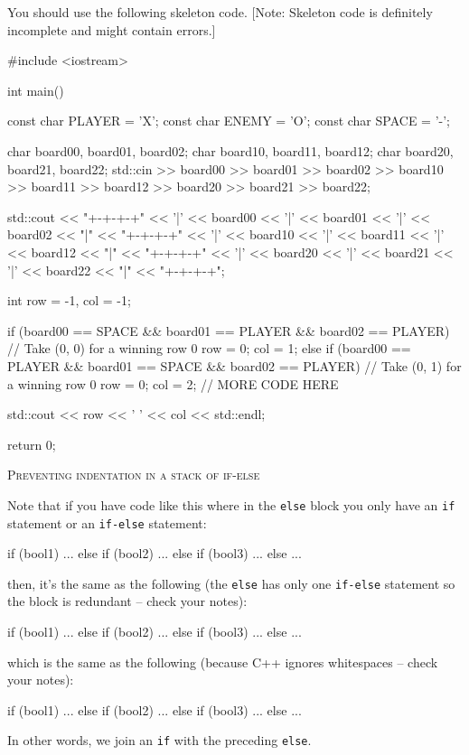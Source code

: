 You should use the following skeleton code.
[Note: Skeleton code is definitely incomplete and might
contain errors.]
{\footnotesize
\begin{console}
#include <iostream>

int main()
{
    const char PLAYER = 'X';
    const char ENEMY = 'O';
    const char SPACE = '-';

    char board00, board01, board02;
    char board10, board11, board12;
    char board20, board21, board22;
    std::cin >> board00 >> board01 >> board02
             >> board10 >> board11 >> board12
             >> board20 >> board21 >> board22;

    std::cout << "+-+-+-+\n"
              << '|' << board00 << '|' << board01 << '|' << board02 << "|\n"
              << "+-+-+-+\n"
              << '|' << board10 << '|' << board11 << '|' << board12 << "|\n"
              << "+-+-+-+\n"
              << '|' << board20 << '|' << board21 << '|' << board22 << "|\n"
              << "+-+-+-+\n";

    int row = -1, col = -1;

    if (board00 == SPACE && board01 == PLAYER && board02 == PLAYER)
    {
        // Take (0, 0) for a winning row 0
        row = 0;
        col = 1;
    }
    else
    {
        if (board00 == PLAYER && board01 == SPACE && board02 == PLAYER)
        {
            // Take (0, 1) for a winning row 0
            row = 0;
            col = 2;
        }
        // MORE CODE HERE
    }

    std::cout << row << ' ' << col << std::endl;

    return 0;
}
\end{console}
}

\newpage
\textsc{Preventing indentation in a stack of if-else}

Note that if you have code like this where 
in the \verb!else! block you only have an 
\verb!if! statement or an 
\verb!if-else! statement:
{\footnotesize
\begin{console}
if (bool1)
{
   ...
}
else
{
    if (bool2)
    {
        ...
    }
    else
    {
        if (bool3)
        {
            ...
        }
        else
        {
            ...
        }
    }
}
\end{console}
}
then, it's the same as the following 
(the \verb!else! has only one \verb!if-else! statement
so the block is redundant -- check your notes):
{\footnotesize
\begin{console}
if (bool1)
{
   ...
}
else
    if (bool2)
    {
        ...
    }
    else
        if (bool3)
        {
            ...
        }
        else
        {
            ...
        }
\end{console}
}
which is the same as the following (because
 C++ ignores whitespaces -- check your notes):
{\footnotesize
\begin{console}
if (bool1)
{
   ...
}
else if (bool2)
{
    ...
}
else if (bool3)
{
    ...
}
else
{
    ...
}
\end{console}
}
In other words, we join an \verb!if! with the preceding \verb!else!.

